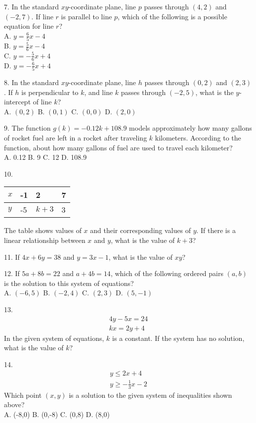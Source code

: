 \documentclass[../satmath.tex]{subfiles}
\begin{document}
7. In the standard $xy$-coordinate plane, line $p$ passes through $(4,2)$ and $(-2,7)$. If line $r$ is parallel to line $p$, which of the following 
is a possible equation for line $r$?\\
A. $y=\frac{6}{5}x-4$\\
B. $y=\frac{5}{6}x-4$\\
C. $y=-\frac{5}{6}x+4$\\
D. $y=-\frac{6}{5}x+4$
\medbreak

8. In the standard $xy$-coordinate plane, line $h$ passes through $(0,2)$ and $(2,3)$. If $h$ is perpendicular to $k$, and line $k$ passes 
through $(-2,5)$, what is the $y$-intercept of line $k$?\\
A. $(0,2)$ \quad B. $(0,1)$ \quad C. $(0,0)$ \quad D. $(2,0)$
\medbreak

9. The function $g(k)=-0.12k+108.9$ models approximately how many gallons of rocket fuel are left in a rocket after traveling $k$ kilometers. 
According to the function, about how many gallons of fuel are used to travel each kilometer?\\
A. 0.12 \quad B. 9 \quad C. 12 \quad D. 108.9
\medbreak

10. 
\begin{table}[h]
    \centering
    \begin{tabular}{|l|l|l|l|}
    \hline
    $x$ & -1 & 2 & 7 \\ \hline
    $y$ & -5 & $k+3$ & 3 \\ \hline
    \end{tabular}
\end{table}
The table shows values of $x$ and their corresponding values of $y$. If there is a linear relationship between $x$ and $y$, what is the value of $k+3$?
\medbreak

11. If $4x+6y=38$ and $y=3x-1$, what is the value of $xy$?
\medbreak

12. If $5a+8b=22$ and $a+4b=14$, which of the following ordered pairs $(a,b)$ is the solution to this system of equations?\\
A. $(-6,5)$ \quad B. $(-2,4)$ \quad C. $(2,3)$ \quad D. $(5,-1)$
\medbreak

13. 
\begin{align*}
4y-5x=24\\
kx=2y+4
\end{align*}
In the given system of equations, $k$ is a constant. If the system has no solution, what is the value of $k$?
\medbreak

14. 
\begin{align*}
y\leq 2x+4\\
y\geq -\frac{1}{3}x-2
\end{align*}
Which point $(x,y)$ is a solution to the given system of inequalities shown above?\\
A. (-8,0) \quad B. (0,-8) \quad C. (0,8) \quad D. (8,0)
\medbreak
\end{document}
